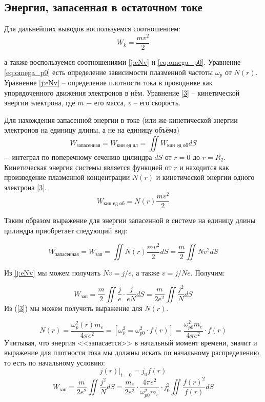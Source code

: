 \documentclass[a4paper]{article}
\begin{document}
\subsection{Энергия, запасенная в остаточном токе}
Для дальнейших выводов воспользуемся соотношением:
\begin{equation}
	W_{k}=\frac{mv^2}{2} 
	\label{3}
\end{equation}

а также воспользуемся соотношениями \eqref{j:eNv} и \eqref{eq:omega_p0}.
Уравнение \eqref{eq:omega_p0} есть определение зависимости плазменной частоты $\omega_{p}$ от $N(r)$.	Уравнение \eqref{j:eNv} -- определение плотности тока в проводнике как упорядоченного движения электронов в нём. Уравнение \eqref{3} --  кинетической энергии электрона, где $m$ $-$  его	масса, $v$ -- его скорость.

Для нахождения запасенной энергии в токе (или же кинетической энергии электронов на единицу длины, а не на единицу объёма)
\begin{equation}
	W_{\text{запасенная}}=W_{\text{кин ед дл}}=\iint W_{\text{кин ед об}}dS
	\label{W_kl}
\end{equation}
$-$ интеграл по поперечному сечению цилиндра $dS$ от $r=0$ до $r = R_2$. \newpage Кинетическая энергия системы является функцией от $r$ и находится как произведение плазменной концентрации $N(r)$ и кинетической энергии одного электрона \eqref{3}.
\begin{equation}
	W_{\text{кин ед об}}=N\left(r\right)\frac{mv^2}{2}
	\label{W_kV}
\end{equation}


Таким образом выражение для энергии запасенной в системе на единицу длины цилиндра приобретает следующий вид: 

\begin{equation}
	W_{\text{запасенная}}=W_{\text{зап}}=\iint N(r)\frac{mv^2}{2}dS=\frac{m}{2}\iint Nv^{2}dS
\end{equation}

Из	\eqref{j:eNv} мы можем получить $Nv=j/e$, а также $v=j/Ne$. Получим: 

\begin{equation}
	W_{\text{зап}}=\frac{m}{2}\iint\frac{j}{e}\cdot\frac{j}{eN} dS=\frac{m}{2e^2}\iint\frac{j^2}{N} dS
\end{equation}
\quad Из (\ref{3}) мы можем получить выражение для $N(r)$.

\begin{equation}
	N(r)=\frac{\omega_{p}^{2}(r)m_{e}}{4\pi e^{2}}=\left[\omega_{p}^{2}=\omega_{p 0}^{2}\cdot f(r)\right]=\frac{\omega_{p 0}^{2}m_{e}}{4\pi e^{2}}\cdot f(r)
\end{equation}
Учитывая, что энергия <<запасается>> в начальный момент времени, значит и выражение для плотности тока мы должны искать по начальному распределению, то есть по начальному условию:
\begin{equation}
	j(r)|_{t=0}=j_{0}f(r)
\end{equation}
\begin{equation}
	W_{\text{зап}}=\frac{m}{2e^2}\iint\frac{j^2}{N} dS=\frac{m_{e}}{2e^{2}}\cdot \frac{4\pi e^{2}}{\omega_{p 0}^{2}m_{e}}\cdot j_{0}^{2}\iint\frac{f(r)^{2}}{f(r)}dS
\end{equation}
\end{document}
